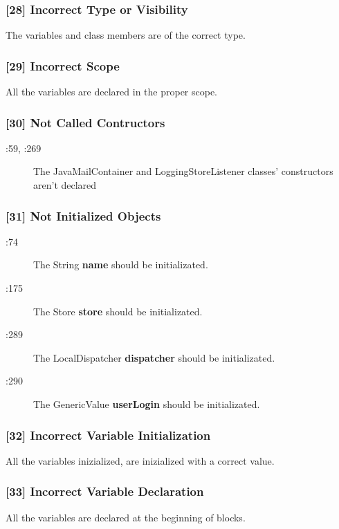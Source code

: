 \subsubsection{[28] Incorrect Type or Visibility}
The variables and class members are of the correct type. 

\subsubsection{[29] Incorrect Scope}
All the variables are declared in the proper scope.

\subsubsection{[30] Not Called Contructors}
\begin{description}
	\item[:59, :269] The JavaMailContainer and LoggingStoreListener classes' constructors aren't declared 
\end{description}

\subsubsection{[31] Not Initialized Objects}
\begin{description}
	\item[:74] The String \textbf{name} should be initializated.
	\item[:175] The Store \textbf{store} should be initializated.
	\item[:289] The LocalDispatcher \textbf{dispatcher} should be initializated.
	\item[:290] The GenericValue \textbf{userLogin} should be initializated.
\end{description}


\subsubsection{[32] Incorrect Variable Initialization}
All the variables inizialized, are inizialized with a correct value.

\subsubsection{[33] Incorrect Variable Declaration}
All the variables are declared at the beginning of blocks.
